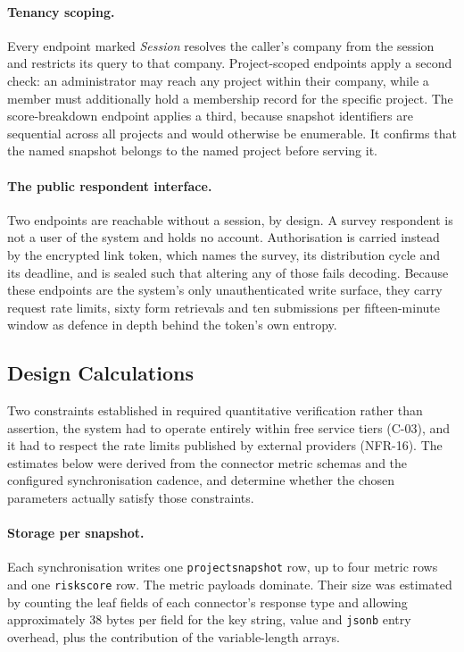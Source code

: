 \paragraph{Tenancy scoping.}
Every endpoint marked \emph{Session} resolves the caller's company from the
session and restricts its query to that company. Project-scoped endpoints apply a
second check: an administrator may reach any project within their company, while
a member must additionally hold a membership record for the specific project. The
score-breakdown endpoint applies a third, because snapshot identifiers are
sequential across all projects and would otherwise be enumerable. It confirms
that the named snapshot belongs to the named project before serving it.

\paragraph{The public respondent interface.}
Two endpoints are reachable without a session, by design. A survey respondent is
not a user of the system and holds no account. Authorisation is carried instead
by the encrypted link token, which names the survey, its distribution cycle and
its deadline, and is sealed such that altering any of those fails decoding.
Because these endpoints are the system's only unauthenticated write surface, they
carry request rate limits, sixty form retrievals and ten submissions per
fifteen-minute window as defence in depth behind the token's own entropy.



\subsection{Design Calculations}
\label{subsec:design-calculations}

Two constraints established in  required
quantitative verification rather than assertion, the system had to operate
entirely within free service tiers (C-03), and it had to respect the rate limits
published by external providers (NFR-16). The estimates below were derived from
the connector metric schemas and the configured synchronisation cadence, and
determine whether the chosen parameters actually satisfy those constraints.

\paragraph{Storage per snapshot.}
Each synchronisation writes one \texttt{projectsnapshot} row, up to four metric
rows and one \texttt{riskscore} row. The metric payloads dominate. Their size was
estimated by counting the leaf fields of each connector's response type and
allowing approximately 38 bytes per field for the key string, value and
\texttt{jsonb} entry overhead, plus the contribution of the variable-length
arrays.

